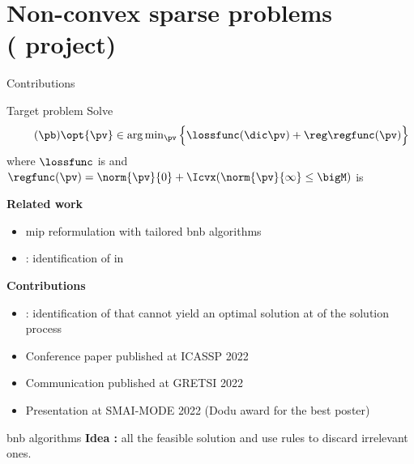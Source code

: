 \section{Non-convex sparse problems \\ {\small ( project)}}

\begin{frame}{Contributions}

  \begin{block}{Target problem}
    Solve
    \begin{equation}
      \label{prob:nonconvex-sparse-problem}
      \tag{$\pb$}
      \opt{\pv} \in \textstyle\arg\min_{\pv} \Big\{ \lossfunc(\dic\pv) + \reg\regfunc(\pv) \Big\}
    \end{equation}
    where $\lossfunc$ is  and $\regfunc(\pv) = \norm{\pv}{0} + \Icvx(\norm{\pv}{\infty} \leq \bigM)$ is 
  \end{block}
  \pause
  \textbf{Related work}
  \begin{itemize}
    \item \gls{mip} reformulation with tailored \gls{bnb} algorithms
    \pause
    \item {} : identification of  in 
  \end{itemize}
  \pause
  \textbf{Contributions}
  \begin{itemize}
    \item {} : identification of  that cannot yield an optimal solution at  of the solution process
    \pause
    \item Conference paper published at ICASSP 2022
    \pause
    \item Communication published at GRETSI 2022
    \pause
    \item Presentation at SMAI-MODE 2022 (Dodu award for the best poster)
  \end{itemize}
\end{frame}

\begin{frame}{\glsdesc{bnb} algorithms}
  \textbf{Idea :}  all the feasible solution and use  rules to discard irrelevant ones.
  \pause
  \begin{center}
    
  \end{center}
\end{frame}

